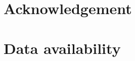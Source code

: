 \documentclass[11pt,twocolumn]{article}
\begin{document}
\section*{Acknowledgement}

\section*{Data availability}



\end{document}
